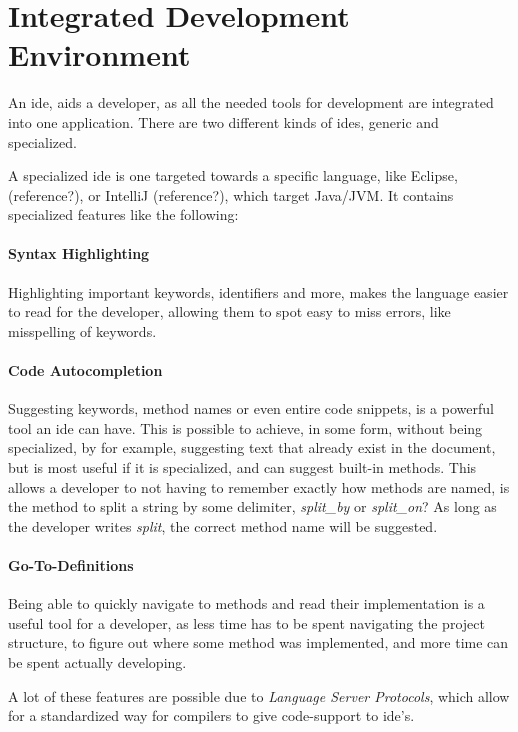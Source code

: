 \section{Integrated Development Environment}

An \gls{ide}, aids a developer, as all the needed tools for development are
integrated into one application. There are two different kinds of \gls{ide}s,
generic and specialized. 

A specialized \gls{ide} is one targeted towards a specific language, like
Eclipse, (reference?), or IntelliJ (reference?), which target Java/JVM. It
contains specialized features like the following:

\paragraph{Syntax Highlighting} Highlighting important keywords, identifiers
and more, makes the language easier to read for the developer, allowing them to
spot easy to miss errors, like misspelling of keywords.

\paragraph{Code Autocompletion} Suggesting keywords, method names or even entire
code snippets, is a powerful tool an \gls{ide} can have. This is possible to
achieve, in some form, without being specialized, by for example, suggesting
text that already exist in the document, but is most useful if it is
specialized, and can suggest built-in methods. This allows a developer to not
having to remember exactly how methods are named, is the method to split a
string by some delimiter, \textit{split\_by} or \textit{split\_on}? As long as
the developer writes \textit{split}, the correct method name will be suggested.

\paragraph{Go-To-Definitions} Being able to quickly navigate to methods and read
their implementation is a useful tool for a developer, as less time has to be
spent navigating the project structure, to figure out where some method was
implemented, and more time can be spent actually developing.

A lot of these features are possible due to \textit{Language Server Protocols},
which allow for a standardized way for compilers to give code-support to
\gls{ide}'s.

